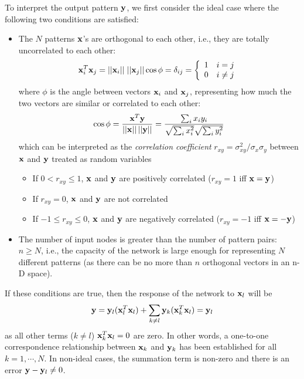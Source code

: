\documentclass{article}
\begin{document}
To interpret the output pattern ${\bf y}$, we first consider the ideal case 
where the following two conditions are satisfied:
\begin{itemize}
\item The $N$ patterns ${\bf x}$'s are orthogonal to each other, i.e., 
  they are totally uncorrelated to each other: 
  \begin{equation}
    {\bf x}_i^T{\bf x}_j=||{\bf x}_i||\;||{\bf x}_j|| \cos \phi 
    = \delta_{ij}=\left\{ \begin{array}{ll} 1 & i=j \\ 0 & i\ne j \end{array} 
    \right. 
  \end{equation}
  where $\phi$ is the angle between vectors ${\bf x}_i$ and ${\bf x}_j$,
  representing how much the two vectors are similar or correlated to each 
  other:
  \begin{equation} 
  \cos\phi = \frac{{\bf x}^T{\bf y}}{||{\bf x}||\,||{\bf y}||}
  =\frac{\sum_i x_i y_i}{\sqrt{\sum_i x_i^2}\sqrt{\sum_i y_i^2} }	
  \end{equation}
  which can be interpreted as the {\em correlation coefficient} 
  $r_{xy}=\sigma_{xy}^2/\sigma_x\sigma_y$ between ${\bf x}$ and ${\bf y}$ 
  treated as random variables
  \begin{itemize}
    \item If $0 < r_{xy} \leq 1$, ${\bf x}$ and ${\bf y}$ are positively 
      correlated ($r_{xy}=1$ \mbox{iff} ${\bf x}={\bf y}$)
    \item If $ r_{xy} =0 $, ${\bf x}$ and ${\bf y}$ are not correlated
    \item If $ -1 \leq r_{xy} \leq 0$, ${\bf x}$ and ${\bf y}$ are negatively
      correlated ($r_{xy}=-1$ \mbox{iff} ${\bf x}=-{\bf y}$) 
  \end{itemize}

\item The number of input nodes is greater than the number of pattern pairs:
  $n \geq N$, i.e., the capacity of the network is large enough for representing
  $N$ different patterns (as there can be no more than $n$ orthogonal vectors in 
  an n-D space). 

\end{itemize}

If these conditions are true, then the response of the network to ${\bf x}_l$
will be 
\begin{equation}
  {\bf y}={\bf y}_l({\bf x}_l^T{\bf x}_l)+\sum_{k\neq l}{\bf y}_k({\bf x}_k^T{\bf x}_l)
  ={\bf y}_l 
\end{equation}
as all other terms ($k \ne l$) ${\bf x}_k^T {\bf x}_l=0$ are zero.
In other words, a one-to-one correspondence relationship between 
${\bf x}_k$ and ${\bf y}_k$ has been established for all $k=1,\cdots,N$.
In non-ideal cases, the summation term is non-zero and there is an error
${\bf y}-{\bf y}_l \neq 0$.
\end{document}
